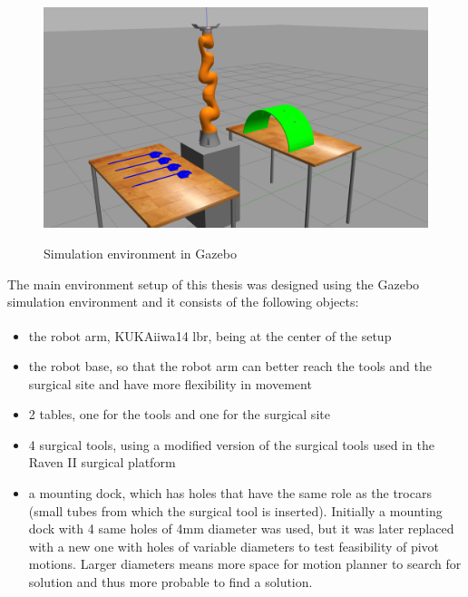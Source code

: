 \begin{center}
\begin{figure}[H]
\centering
\includegraphics[width=12cm]{images/gazebo-sim1.png}\\
\caption{Simulation environment in Gazebo}
\end{figure}
\end{center}

The main environment setup of this thesis was designed using the Gazebo simulation environment and 
it consists of the following objects:
\begin{itemize}
\item the robot arm, KUKA\textsuperscript \textregistered iiwa14 lbr, being at the center of the setup
\item the robot base, so that the robot arm can better reach the tools and the surgical site and have more flexibility in movement
\item 2 tables, one for the tools and one for the surgical site
\item 4 surgical tools, using a modified version of the surgical tools used in the Raven II surgical platform
\item a mounting dock, which has holes that have the same role as the trocars (small tubes from 
which the surgical tool is inserted). Initially a mounting dock with 4 same holes of 4mm diameter was used, but it was later replaced with a new one with holes of variable diameters to test feasibility of pivot motions. Larger diameters means more space for motion planner to search for solution and thus more probable to find a solution.
\end{itemize}

